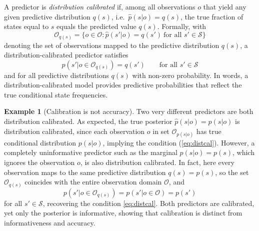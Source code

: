 \documentclass[journal]{IEEEtran}
\theoremstyle{definition}
\newtheorem{example}{Example}
\theoremstyle{remark}
\newcommand{\Sset}{\mathcal{S}}
\newcommand{\Oset}{\mathcal{O}}
\begin{document}
A predictor is \emph{distribution calibrated} if, among all observations $o$
that yield any given predictive distribution $q(s)$, i.e.\
$\hat{p}(s| o)=q(s)$, the true fraction of states equal to $s$ equals the
predicted value $q(s)$. Formally, with
\begin{equation}
\label{eq:Oq}
\Oset_{q(s)}=\{o\in \Oset:\hat p(s'| o)=q(s')\ \text{for all }s'\in\Sset\}
\end{equation}
denoting the set of observations mapped to the predictive distribution $q(s)$, a
distribution-calibrated predictor satisfies
\begin{equation}
\label{eq:distcal}
p(s' | o\in\Oset_{q(s)})=q(s')\qquad \text{for all } s'\in\Sset
\end{equation} and for all predictive distributions $q(s)$ with non-zero probability. 
In words, a distribution-calibrated model provides predictive probabilities
that reflect the true conditional state frequencies.

\begin{example}[Calibration is not accuracy]
\label{ex:cal}
Two very different predictors are both distribution calibrated. As expected, the true posterior $\hat p(s| o)=p(s| o)$ is distribution calibrated, since each observation $o$ in set $\Oset_{p(s|o)}$ has true conditional distribution $p(s|o)$, implying the condition (\ref{eq:distcal}). However, a completely uninformative predictor such as the marginal $\hat p(s| o)=p(s)$, which ignores the
observation $o$, is also distribution calibrated. In fact, here every observation maps to the same predictive
distribution $q(s)=p(s)$, so the set  $\Oset_{q(s)}$ coincides with the entire observation domain $\mathcal O$, and 
\begin{equation}
p(s'| o\in\Oset_{q(s)})=p(s'| o\in\Oset)=p(s')
\end{equation} for all $s' \in \mathcal{S}$,   
recovering the condition \eqref{eq:distcal}. Both predictors are calibrated, yet only the posterior is
informative, showing that calibration is distinct from informativeness and accuracy.
\end{example}
\end{document}
